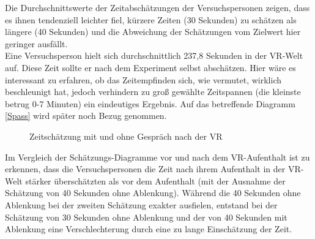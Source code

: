 \documentclass{Paper}
\begin{document}
Die Durchschnittswerte der Zeitabschätzungen der Versuchspersonen zeigen, dass es ihnen tendenziell leichter fiel, kürzere Zeiten (30 Sekunden) zu schätzen als längere (40 Sekunden) und die Abweichung der Schätzungen vom Zielwert hier geringer ausfällt.\\
Eine Versuchsperson hielt sich durchschnittlich 237,8 Sekunden in der VR-Welt auf. Diese Zeit sollte er nach dem Experiment selbst abschätzen. Hier wäre es interessant zu erfahren, ob das Zeitempfinden sich, wie vermutet, wirklich beschleunigt hat, jedoch verhindern zu groß gewählte Zeitspannen (die kleinste betrug 0-7 Minuten) ein eindeutiges Ergebnis. Auf das betreffende Diagramm \ref{Spass} wird später noch Bezug genommen.
 

\begin{figure}[H]
\caption{Zeitschätzung mit und ohne Gespräch nach der VR}
\label{ZeitNachVR}
\end{figure}

Im Vergleich der Schätzungs-Diagramme vor und nach dem VR-Aufenthalt ist zu erkennen, dass die Versuchspersonen die Zeit nach ihrem Aufenthalt in der VR-Welt stärker überschätzten als vor dem Aufenthalt (mit der Ausnahme der Schätzung von 40 Sekunden ohne Ablenkung). Während die 40 Sekunden ohne Ablenkung bei der zweiten Schätzung exakter ausfielen, entstand bei der Schätzung von 30 Sekunden ohne Ablenkung und der von 40 Sekunden mit Ablenkung eine Verschlechterung durch eine zu lange Einschätzung der Zeit.
\end{document}

